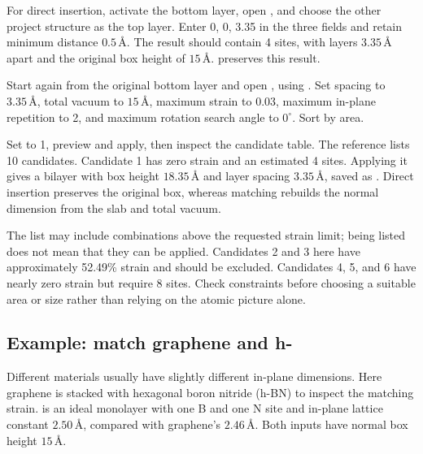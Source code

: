 For direct insertion, activate the bottom layer, open , and choose the other project structure as the top layer. Enter 0, 0, 3.35 in the three  fields and retain minimum distance $0.5\,\text{\AA}$. The result should contain 4 sites, with layers $3.35\,\text{\AA}$ apart and the original box height of $15\,\text{\AA}$.  preserves this result.

Start again from the original bottom layer and open , using . Set spacing to $3.35\,\text{\AA}$, total vacuum to $15\,\text{\AA}$, maximum strain to 0.03, maximum in-plane repetition to 2, and maximum rotation search angle to $0^\circ$. Sort by area.

Set  to 1, preview and apply, then inspect the candidate table. The reference lists 10 candidates. Candidate 1 has zero strain and an estimated 4 sites. Applying it gives a bilayer with box height $18.35\,\text{\AA}$ and layer spacing $3.35\,\text{\AA}$, saved as . Direct insertion preserves the original box, whereas matching rebuilds the normal dimension from the slab and total vacuum.

The list may include combinations above the requested strain limit; being listed does not mean that they can be applied. Candidates 2 and 3 here have approximately 52.49\% strain and should be excluded. Candidates 4, 5, and 6 have nearly zero strain but require 8 sites. Check constraints before choosing a suitable area or size rather than relying on the atomic picture alone.

\subsection{Example: match graphene and h-}

Different materials usually have slightly different in-plane dimensions. Here graphene is stacked with hexagonal boron nitride (h-BN) to inspect the matching strain.  is an ideal monolayer with one B and one N site and in-plane lattice constant $2.50\,\text{\AA}$, compared with graphene's $2.46\,\text{\AA}$. Both inputs have normal box height $15\,\text{\AA}$.

